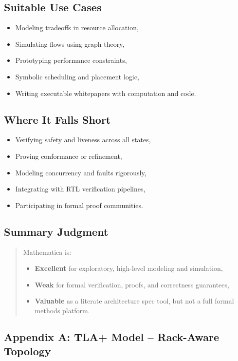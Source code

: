 \subsection*{Suitable Use Cases}

\begin{itemize}
  \item Modeling tradeoffs in resource allocation,
  \item Simulating flows using graph theory,
  \item Prototyping performance constraints,
  \item Symbolic scheduling and placement logic,
  \item Writing executable whitepapers with computation and code.
\end{itemize}

\subsection*{Where It Falls Short}

\begin{itemize}
  \item Verifying safety and liveness across all states,
  \item Proving conformance or refinement,
  \item Modeling concurrency and faults rigorously,
  \item Integrating with RTL verification pipelines,
  \item Participating in formal proof communities.
\end{itemize}

\subsection{Summary Judgment}

\begin{quote}
Mathematica is:
\begin{itemize}
  \item \textbf{Excellent} for exploratory, high-level modeling and simulation,
  \item \textbf{Weak} for formal verification, proofs, and correctness guarantees,
  \item \textbf{Valuable} as a literate architecture spec tool, but not a full formal methods platform.
\end{itemize}
\end{quote}

\subsection{Appendix A: TLA+ Model -- Rack-Aware Topology}

